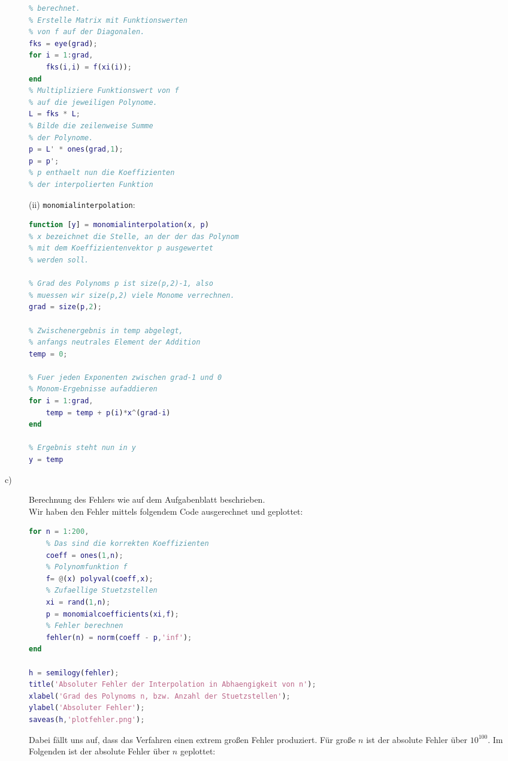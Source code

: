 \documentclass[11pt,a4paper,ngerman]{article}
\begin{document}
\begin{description}
\begin{lstlisting}[language=matlab]
% Nun sind alle Lagrange-Polynome
% berechnet.
% Erstelle Matrix mit Funktionswerten
% von f auf der Diagonalen.
fks = eye(grad);
for i = 1:grad,
    fks(i,i) = f(xi(i));
end
% Multipliziere Funktionswert von f
% auf die jeweiligen Polynome.
L = fks * L;
% Bilde die zeilenweise Summe
% der Polynome.
p = L' * ones(grad,1); 
p = p';
% p enthaelt nun die Koeffizienten
% der interpolierten Funktion
\end{lstlisting}
\newpage
(ii) \texttt{monomialinterpolation}:

\begin{lstlisting}[language=matlab]
function [y] = monomialinterpolation(x, p)
% x bezeichnet die Stelle, an der der das Polynom
% mit dem Koeffizientenvektor p ausgewertet
% werden soll.

% Grad des Polynoms p ist size(p,2)-1, also
% muessen wir size(p,2) viele Monome verrechnen.
grad = size(p,2);

% Zwischenergebnis in temp abgelegt,
% anfangs neutrales Element der Addition
temp = 0;

% Fuer jeden Exponenten zwischen grad-1 und 0
% Monom-Ergebnisse aufaddieren
for i = 1:grad,
    temp = temp + p(i)*x^(grad-i)
end

% Ergebnis steht nun in y
y = temp
\end{lstlisting}

\item[c)] Berechnung des Fehlers wie auf dem Aufgabenblatt beschrieben. \\

Wir haben den Fehler mittels folgendem Code ausgerechnet und geplottet:

\begin{lstlisting}[language=matlab]
for n = 1:200,
    % Das sind die korrekten Koeffizienten
    coeff = ones(1,n);
    % Polynomfunktion f
    f= @(x) polyval(coeff,x);
    % Zufaellige Stuetzstellen
    xi = rand(1,n);
    p = monomialcoefficients(xi,f);
    % Fehler berechnen
    fehler(n) = norm(coeff - p,'inf');
end

h = semilogy(fehler);
title('Absoluter Fehler der Interpolation in Abhaengigkeit von n');
xlabel('Grad des Polynoms n, bzw. Anzahl der Stuetzstellen');
ylabel('Absoluter Fehler');
saveas(h,'plotfehler.png');
\end{lstlisting}

Dabei fällt uns auf, dass das Verfahren einen extrem großen Fehler produziert. Für große $n$ ist der absolute Fehler über $10^{100}$. Im Folgenden ist der absolute Fehler über $n$ geplottet: \\


\end{description}
\end{document}
